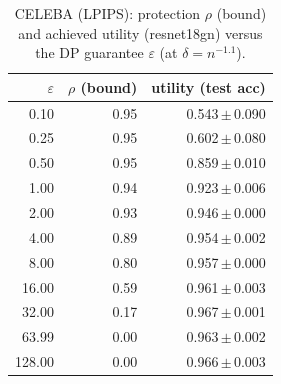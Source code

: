 \begin{table}[t]
  \centering
  \caption{CELEBA (LPIPS): protection $\rho$ (bound) and achieved utility (resnet18gn) versus the DP guarantee $\varepsilon$ (at $\delta=n^{-1.1}$).}
  \label{tab:util_celeba_lpips}
  \begin{tabular}{r r r}
    \toprule
    $\varepsilon$ & $\rho$ (bound) & utility (test acc) \\
    \midrule
    0.10 & 0.95 & 0.543\,$\pm$\,0.090 \\
    0.25 & 0.95 & 0.602\,$\pm$\,0.080 \\
    0.50 & 0.95 & 0.859\,$\pm$\,0.010 \\
    1.00 & 0.94 & 0.923\,$\pm$\,0.006 \\
    2.00 & 0.93 & 0.946\,$\pm$\,0.000 \\
    4.00 & 0.89 & 0.954\,$\pm$\,0.002 \\
    8.00 & 0.80 & 0.957\,$\pm$\,0.000 \\
    16.00 & 0.59 & 0.961\,$\pm$\,0.003 \\
    32.00 & 0.17 & 0.967\,$\pm$\,0.001 \\
    63.99 & 0.00 & 0.963\,$\pm$\,0.002 \\
    128.00 & 0.00 & 0.966\,$\pm$\,0.003 \\
    \bottomrule
  \end{tabular}
\end{table}
